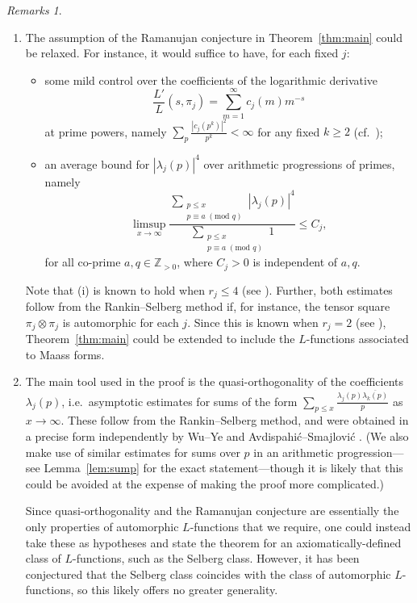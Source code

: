 \documentclass[11pt]{amsart}
\theoremstyle{remark}
\newtheorem*{remarks}{Remarks}
\numberwithin{theorem}{section}
\numberwithin{equation}{section}
\newcommand{\Z}{\mathbb{Z}}
\begin{document}
\begin{remarks}
\begin{enumerate}
\item The assumption of the Ramanujan conjecture in Theorem~\ref{thm:main}
could be relaxed. For instance, it would suffice to have, for each
fixed $j$:
\begin{itemize}
\item[(i)]some mild control over the
coefficients of the logarithmic derivative
$$\frac{L'}{L}(s,\pi_j)=\sum_{m=1}^\infty c_j(m)m^{-s}$$
at prime powers, namely
$\sum_p\frac{|c_j(p^k)|^2}{p^k}<\infty$
for any fixed $k\ge2$ (cf.\ \cite[Hypothesis H]{rs});
\item[(ii)]an average bound for $|\lambda_j(p)|^4$ over arithmetic
progressions of primes, namely
$$
\limsup_{x\to\infty}
\frac{\sum_{\substack{p\le x\\p\equiv a\;(\text{mod }q)}}|\lambda_j(p)|^4}
{\sum_{\substack{p\le x\\p\equiv a\;(\text{mod }q)}}1}
\le C_j,
$$
for all co-prime $a,q\in\Z_{>0}$, where $C_j>0$ is independent of $a,q$.
\end{itemize}
Note that (i) is known to hold when $r_j\le 4$ (see \cite{rs,kim}).
Further, both estimates follow from the Rankin--Selberg method if,
for instance, the tensor square $\pi_j\otimes\pi_j$ is automorphic
for each $j$. Since this is known when $r_j=2$ (see \cite{gj}),
Theorem~\ref{thm:main} could be extended to include the $L$-functions
associated to Maass forms.

\item The main tool used in the proof is the quasi-orthogonality of
the coefficients $\lambda_j(p)$, i.e.\ asymptotic estimates for sums of
the form $\sum_{p\le x}\frac{\lambda_j(p)\overline{\lambda_k(p)}}p$
as $x\to\infty$. These follow from the Rankin--Selberg method, and
were obtained in a precise form independently by
Wu--Ye \cite[Thm.~3]{wu-ye} and Avdispahi\'c--Smajlovi\'c \cite[Thm.~2.2]{as}.
(We also make use of similar estimates for sums over $p$ in an arithmetic
progression---see Lemma~\ref{lem:sump} for the exact statement---though
it is likely that this could be avoided at the expense of making the
proof more complicated.)

Since quasi-orthogonality and the Ramanujan conjecture are essentially
the only properties of automorphic $L$-functions that we require,
one could instead take these as hypotheses and state the theorem for
an axiomatically-defined class of $L$-functions, such as the Selberg
class. However, it has been conjectured that the Selberg
class coincides with the class of automorphic $L$-functions, so this
likely offers no greater generality.


\end{enumerate}
\end{remarks}
\end{document}

